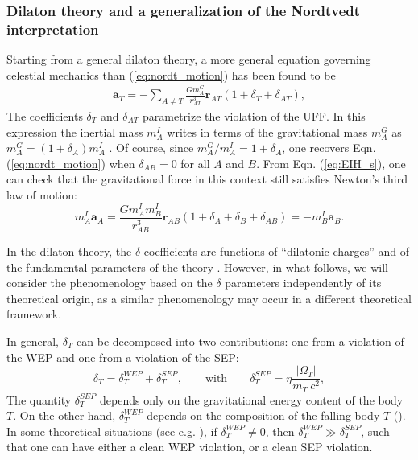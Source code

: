 \documentclass[fleqn,usenatbib,referee]{mnras}
\begin{document}
\subsubsection{Dilaton theory and a generalization of the Nordtvedt interpretation}
\label{dil_theory}
Starting from a general dilaton theory,  a more general equation governing celestial mechanics than (\ref{eq:nordt_motion}) has been found to be \cite[]{hees:2015ax,minazzoli:2016pr}
\begin{eqnarray}
\bm {a}_T=-\sum_{A\neq T} \frac{G m^G_A}{r_{AT}^3}\bm r_{AT}\left(1+\delta_T+\delta_{AT}\right) \label{eq:EIH_s},
\end{eqnarray}
 The coefficients $\delta_T$ and $\delta_{AT}$ parametrize the violation of the UFF.  In this expression the inertial mass $m^I_A$ writes in terms of the gravitational mass $m^G_A$ as $m^G_A=(1+\delta_A) m^I_A$ \cite[]{hees:2015ax,minazzoli:2016pr}. Of course, since $m_A^G/m_A^I=1+\delta_A$, one recovers Eqn. (\ref{eq:nordt_motion}) when $\delta_{AB}=0$ for all $A$ and $B$. From Eqn. (\ref{eq:EIH_s}), one can check that the gravitational force in this context still satisfies Newton's third law of motion:
\begin{equation}
m^I_A\bm {a}_A =\frac{G m^I_A m^I_B}{r_{AB}^3}\bm r_{AB}\left(1+\delta_A+\delta_B+\delta_{AB}\right)=- m^I_B\bm {a}_B.
\end{equation}

In the dilaton theory, the $\delta$ coefficients are functions of ``dilatonic charges'' and of the fundamental parameters of the theory \cite[]{Damour2010,hees:2015ax,minazzoli:2016pr}. However, in what follows, we will consider the phenomenology based on the $\delta$ parameters independently of its theoretical origin, as a similar phenomenology may occur in a different theoretical framework.

In general, $\delta_T$ can be decomposed into two contributions: one from a violation of the WEP and one from a violation of the SEP:
\begin{equation}
\label{eta_sep}
\delta_T=\delta_T^{WEP}+\delta_T^{SEP},\qquad \textrm{with}\qquad \delta_T^{SEP} = \eta \frac{|\Omega_T|}{m_T~c^2},
\end{equation}
The quantity $\delta_T^{SEP}$ depends only on the gravitational energy content of the body $T$. On the other hand, $\delta_T^{WEP}$ depends on the composition of the falling body $T$ (\cite{Damour2010,hees:2015ax,minazzoli:2016pr}). In some theoretical situations (see e.g. \cite{Damour2010}), if $\delta_T^{WEP} \neq 0$, then $\delta_T^{WEP} \gg  \delta_T^{SEP}$, such that one can have either a clean WEP violation, or a clean SEP violation.
\end{document}
